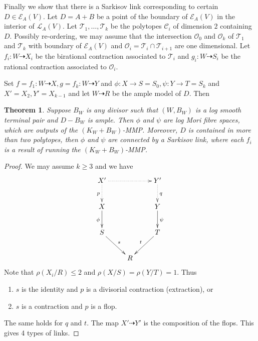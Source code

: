 \documentclass[11pt]{amsart}
\newtheorem{thm}[defn]{Theorem}
\begin{document}
Finally we show that there is a Sarkisov link corresponding to certain $D \in \mathcal{E}_{A}(V)$. Let $ D=A+B $ be a point of the boundary of $ \mathcal{E}_A(V) $ in the interior of $ \mathcal{L}_A(V) $. Let $ \mathcal{T}_1, \ldots, \mathcal{T}_k $ be the polytopes $ \mathcal{C}_i $ of dimension $ 2 $ containing $ D $. Possibly re-ordering, we may assume that  the intersection  $ \mathcal{O}_0 $ and $ \mathcal{O}_k $ of $ \mathcal{T}_1 $ and $ \mathcal{T}_k $ with boundary of $ \mathcal{E}_A(V) $ and  $ \mathcal{O}_i=\mathcal{T}_i\cap\mathcal{T}_{i+1} $ are one dimensional. Let $ f_i:W\dashrightarrow  X_i $ be the birational contraction associated to $ \mathcal{T}_i $ and $ g_i:W\dashrightarrow  S_i $ be the rational contraction associated to $ \mathcal{O}_i $.
\begin{center}
\end{center}

Set $ f=f_1:W\dashrightarrow X, g=f_k:W\dashrightarrow Y $ and $ \phi:X\to S=S_0,\psi:Y\to T=S_k $ and $ X'=X_2,Y'=X_{k-1} $ and let $ W\dashrightarrow R $ be the ample model of $ D $. Then
\begin{thm}\label{constructlink}
  \cite[Theorem 3.7]{haconSarkisovProgram2012} Suppose $ B_W $ is any divisor such that $ (W,B_W) $ is a log smooth terminal pair and $ D-B_W $ is ample. Then $ \phi $ and $ \psi $ are log Mori fibre spaces, which are outputs of the $ (K_W+B_W) $-MMP. Moreover, $ D $ is contained in more than two polytopes, then $\phi$ and $\psi$ are connected by a Sarkisov link, where each $f_{i}$ is a result of running the $(K_{W}+B_{W})$-MMP. 
\end{thm}
\begin{proof}
  We may assume $ k\geqslant 3 $ and we have 
  $$ \xymatrix{
  X'\ar@{.>}[d]_p\ar@{.>}[rr]&&Y'\ar@{.>}[d]^q\\
  X\ar[d]_{\phi}&&Y\ar[d]^\psi\\
  S\ar[rd]^s&&T\ar[ld]_t\\
  &R&} $$
Note that $ \rho(X_i/R)\leqslant 2 $ and $ \rho(X/S)=\rho(Y/T)=1 $. Thus 
\begin{enumerate}
  \item $ s $ is the identity and $ p $ is a divisorial contraction (extraction), or
  \item $ s $ is a contraction and $ p $ is a flop.
\end{enumerate}
The same holds for $ q $ and $ t $. The map $X'\dashrightarrow Y'$ is the composition of the flops. This gives 4 types of links.
\end{proof}
\end{document}
